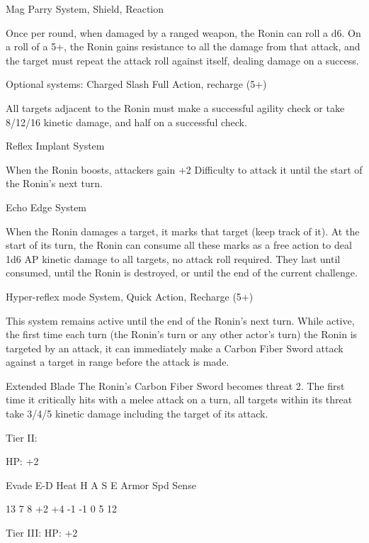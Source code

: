 Mag Parry  
System, Shield, Reaction
 
Once per round, when damaged by a ranged weapon, the Ronin can roll a d6. On a roll of a 5+,  
the Ronin gains resistance to all the damage from that attack, and the target must repeat the  
attack roll against itself, dealing damage on a success.
 

Optional systems:  
Charged Slash  
Full Action, recharge (5+)
 

                                                                                                          


All targets adjacent to the Ronin must make a successful agility check or take 8/12/16 kinetic  
damage, and half on a successful check.
 

Reflex Implant  
System
 
When the Ronin boosts, attackers gain +2 Difficulty to attack it until the start of the Ronin’s next  
turn.
 

Echo Edge  
System
 
When the Ronin damages a target, it marks that target (keep track of it). At the start of its turn,  
the Ronin can consume all these marks as a free action to deal 1d6 AP kinetic damage to all  
targets, no attack roll required. They last until consumed, until the Ronin is destroyed, or until the  
end of the current challenge.
 

Hyper-reflex mode  
System, Quick Action, Recharge (5+)
 
This system remains active until the end of the Ronin’s next turn. While active, the first time each  
turn (the Ronin’s turn or any other actor’s turn) the Ronin is targeted by an attack, it can  
immediately make a Carbon Fiber Sword attack against a target in range before the attack is  
made.
 

Extended Blade  
The Ronin’s Carbon Fiber Sword becomes threat 2. The first time it critically hits with a melee  
attack on a turn, all targets within its threat take 3/4/5 kinetic damage including the target of its  
attack.
 

Tier II:
 
HP: +2
 

          Evade    E-D    Heat     H    A     S     E       Armor        Spd      Sense 

          13       7      8        +2   +4    -1    -1      0            5        12 

Tier III:  
HP: +2
 


